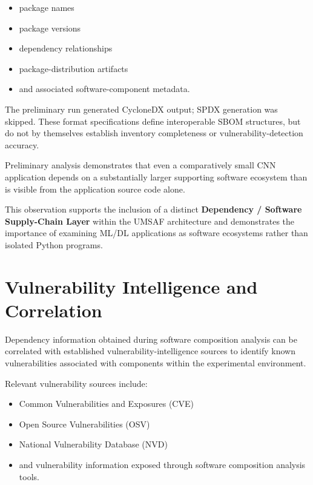 \documentclass[
  12pt,
  letterpaper,
  oneside]{report}
\providecommand{\tightlist}{%
  \setlength{\itemsep}{0pt}\setlength{\parskip}{0pt}}
\begin{document}
\begin{itemize}
\tightlist
\item
  package names
\item
  package versions
\item
  dependency relationships
\item
  package-distribution artifacts
\item
  and associated software-component metadata.
\end{itemize}

The preliminary run generated CycloneDX output; SPDX generation was
skipped. These format specifications define interoperable SBOM
structures, but do not by themselves establish inventory completeness
or vulnerability-detection accuracy.\cite{cyclonedxSpecification,spdxSpecification}

Preliminary analysis demonstrates that even a comparatively small CNN
application depends on a substantially larger supporting software
ecosystem than is visible from the application source code alone.

This observation supports the inclusion of a distinct \textbf{Dependency
/ Software Supply-Chain Layer} within the UMSAF architecture and
demonstrates the importance of examining ML/DL applications as software
ecosystems rather than isolated Python programs.

\section{Vulnerability Intelligence and Correlation}\label{94-vulnerability-intelligence-and-correlation}

Dependency information obtained during software composition analysis can
be correlated with established vulnerability-intelligence sources to
identify known vulnerabilities associated with components within the
experimental environment.

Relevant vulnerability sources include:

\begin{itemize}
\tightlist
\item
  Common Vulnerabilities and Exposures (CVE)
\item
  Open Source Vulnerabilities (OSV)
\item
  National Vulnerability Database (NVD)
\item
  and vulnerability information exposed through software composition
  analysis tools.
\end{itemize}
\end{document}
